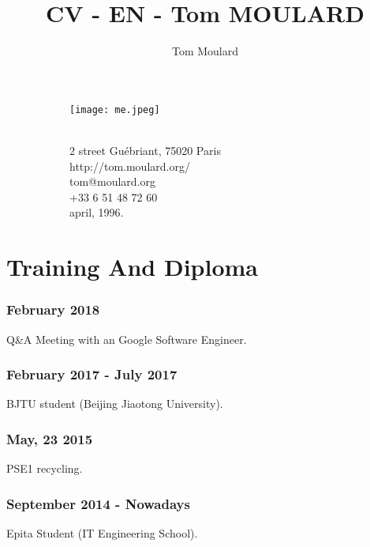 \documentclass{article}
\begin{document}
    \title{CV - EN - Tom MOULARD}

    \author{Tom Moulard}


    \begin{center}
        \begin{figure}
            \centering
            \begin{subfigure}[b]{0.3\textwidth}
                \texttt{[image: me.jpeg]}
            \end{subfigure}
            \begin{subfigure}[b]{0.3\textwidth}
                {\huge\bfseries\theauthor}\\
                \vspace{.25em}
                2 street Gu\'ebriant, 75020 Paris\\
                http://tom.moulard.org/\\
                tom@moulard.org\\
                +33 6 51 48 72 60\\
                april,  1996.
            \end{subfigure}
        \end{figure}
    \end{center}

    \section{Training And Diploma}
        \subsubsection{February 2018}
            Q{\&}A Meeting with an Google Software Engineer.
        \subsubsection{February 2017 - July 2017}
            BJTU student (Beijing Jiaotong University).
        \subsubsection{May, 23 2015}
            PSE1 recycling.
        \subsubsection{September 2014 - Nowadays}
            Epita Student (IT Engineering School).
\end{document}
